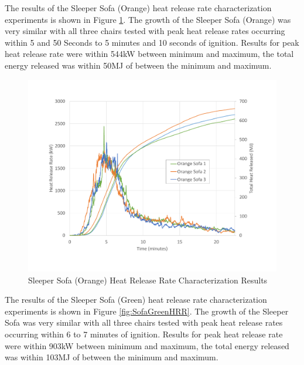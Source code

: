 \documentclass{article}
\begin{document}
\clearpage

The results of the Sleeper Sofa (Orange) heat release rate characterization experiments is shown in Figure \ref{fig:SofaOrangeHRR}. The growth of the Sleeper Sofa (Orange) was very similar with all three chairs tested with peak heat release rates occurring within 5 and 50 Seconds to 5 minutes and 10 seconds of ignition. Results for peak heat release rate were within 544kW between minimum and maximum, the total energy released was within 50MJ of between the minimum and maximum. 

\begin{figure}[H]
	\centering
	\includegraphics[height=0.45\textheight]{0_Images/Furniture/Sofa_Orange_HRR.pdf}
	\caption{Sleeper Sofa (Orange) Heat Release Rate Characterization Results}
	\label{fig:SofaOrangeHRR}
\end{figure}

\clearpage

The results of the Sleeper Sofa (Green) heat release rate characterization experiments is shown in Figure \ref{fig:SofaGreenHRR}. The growth of the Sleeper Sofa was very similar with all three chairs tested with peak heat release rates occurring within 6 to 7 minutes of ignition. Results for peak heat release rate were within 903kW between minimum and maximum, the total energy released was within 103MJ of between the minimum and maximum. 
\end{document}
